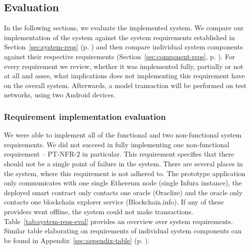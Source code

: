 \subsection{Evaluation}

In the following sections, we evaluate the implemented system. We compare our implementation of the system against the system requirements established in Section~\ref{sec:system-reqs} (p. \pageref{sec:system-reqs}) and then compare individual system components against their respective requirements (Section~\ref{sec:component-reqs}, p. \pageref{sec:component-reqs}). For every requirement we review, whether it was implemented fully, partially or not at all and asses, what implications does not implementing this requirement have on the overall system. Afterwards, a model transaction will be performed on test networks, using two Android devices.

\subsubsection{Requirement implementation evaluation}

We were able to implement all of the functional and two non-functional system requirements. We did not succeed in fully implementing one non-functional requirement -- PT-NFR-2 in particular. This requirement specifies that there should not be a single point of failure in the system. There are several places in the system, where this requirement is not adhered to. The prototype application only communicates with one single Ethereum node (single Infura instance), the deployed smart contract only contacts one oracle (Oraclize) and the oracle only contacts one blockchain explorer service (Blockchain.info). If any of these providers went offline, the system could not make transactions. Table~\ref{tab:system-reqs-eval} provides an overview over system requirements. Similar table elaborating on requirements of individual system components can be found in Appendix~\ref{sec:appendix-table} (p. \pageref{sec:appendix-table}).

